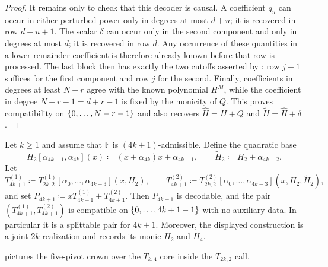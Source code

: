 \begin{proof}
It remains only to check that this decoder is causal.  A coefficient $q_u$
can occur in either perturbed power only in degrees at most $d+u$; it is
recovered in row $d+u+1$.  The scalar $\delta$ can occur only in the second
component and only in degrees at most $d$; it is recovered in row $d$.
Any occurrence of these quantities in a lower remainder coefficient is
therefore already known before that row is processed.  The last block then
has exactly the two cutoffs asserted by : row $j+1$ suffices
for the first component and row $j$ for the second.  Finally, coefficients
in degrees at least $N-r$ agree with the known polynomial $H^M$, while the
coefficient in degree $N-r-1=d+r-1$ is fixed by the monicity of $Q$.
This proves compatibility on $\{0,\dotsc,N-r-1\}$ and also recovers
$\widehat H=H+Q$ and $\widetilde H=\widehat H+\delta$.
\end{proof}

\begin{lemma}\label{lem:4k+1-splittable}
    Let $k\ge1$ and assume that $\mathbb F$ is $(4k+1)$-admissible.
    Define the quadratic base
    \[
      H_2[\alpha_{4k-1},\alpha_{4k}](x)\coloneqq (x+\alpha_{4k})x+\alpha_{4k-1},
      \qquad
      \tilde H_2\coloneqq H_2+\alpha_{4k-2}.
    \]
    Let
    \[
      T^{(1)}_{4k+1}\coloneqq T^{(1)}_{2k,2}[\alpha_0,\ldots,\alpha_{4k-3}](x,H_2),
      \qquad
      T^{(2)}_{4k+1}\coloneqq T^{(2)}_{2k,2}[\alpha_0,\ldots,\alpha_{4k-3}](x,H_2,\tilde H_2),
    \]
    and set $P_{4k+1}\coloneqq xT^{(1)}_{4k+1}+T^{(2)}_{4k+1}$.
    Then $P_{4k+1}$ is decodable, and the pair
    $(T^{(1)}_{4k+1},T^{(2)}_{4k+1})$ is compatible on
    $\{0,\dotsc,4k+1-1\}$ with no auxiliary data.  In particular it is a splittable
    pair for $4k+1$.  Moreover, the displayed construction is a joint
    $2k$-realization and records its monic $H_2$ and $H_4$.
\end{lemma}

 pictures the five-pivot crown over the $T_{k,4}$ core
inside the $T_{2k,2}$ call.

